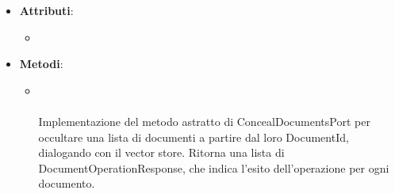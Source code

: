 \documentclass[10pt, a4paper]{article}
\begin{document}
    \label{ConcealDocumentsVectorStoreDettaglio}
    \begin{itemize}
        \item \textbf{Attributi}:
        \begin{itemize}
            \item 
        \end{itemize}
        \item \textbf{Metodi}:
        \begin{itemize}
            \item {}\\ \\
            Implementazione del metodo astratto di ConcealDocumentsPort per occultare una lista di documenti a partire dal loro DocumentId, dialogando con il vector store. Ritorna una lista di DocumentOperationResponse, che indica l'esito dell'operazione per ogni documento.
        \end{itemize}
    \end{itemize}
    
\end{document}
